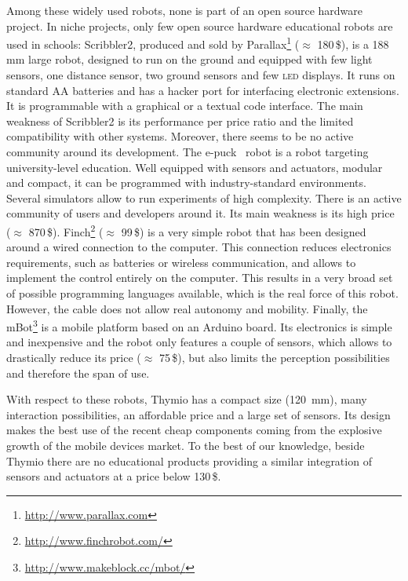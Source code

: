 \documentclass[letterpaper, 10 pt, conference]{ieeeconf}  %
\begin{document}
Among these widely used robots, none is part of an open source hardware project.
In niche projects, only few open source hardware educational robots are used in schools:
Scribbler2, produced and sold by Parallax\footnote{\url{http://www.parallax.com}} ($\approx$ 180\,\$), is a 188\,mm large robot, designed to run on the ground and equipped with few light sensors, one distance sensor, two ground sensors and few \textsc{led} displays.
It runs on standard AA batteries and has a hacker port for interfacing electronic extensions.
It is programmable with a graphical or a textual code interface.  
The main weakness of Scribbler2 is its performance per price ratio and the limited compatibility with other systems. 
Moreover, there seems to be no active community around its development.
The e-puck~\cite{mondada2009puck} robot is a robot targeting university-level education.
Well equipped with sensors and actuators, modular and compact, it can be programmed with industry-standard environments.
Several simulators allow to run experiments of high complexity. 
There is an active community of users and developers around it.
Its main weakness is its high price ($\approx$ 870\,\$).
Finch\footnote{\url{http://www.finchrobot.com/}} ($\approx$ 99\,\$) is a very simple robot that has been designed around a wired connection to the computer. 
This connection reduces electronics requirements, such as batteries or wireless communication, and allows to implement the control entirely on the computer.
This results in a very broad set of possible programming languages available, which is the real force of this robot. 
However, the cable does not allow real autonomy and mobility.
Finally, the mBot\footnote{\url{http://www.makeblock.cc/mbot/}} is a mobile platform based on an Arduino board.
Its electronics is simple and inexpensive and the robot only features a couple of sensors, which allows to drastically reduce its price ($\approx$ 75\,\$), but also limits the perception possibilities and therefore the span of use.

With respect to these robots, Thymio has a compact size (120~mm), many interaction possibilities, an affordable price and a large set of sensors.
Its design makes the best use of the recent cheap components coming from the explosive growth of the mobile devices market. 
To the best of our knowledge, beside Thymio there are no educational products providing a similar integration of sensors and actuators at a price below 130\,\$.
\end{document}

